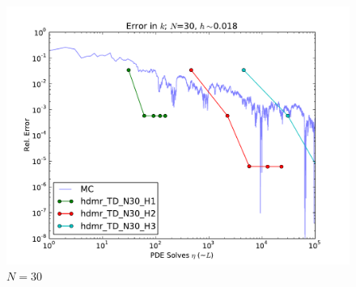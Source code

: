 \documentclass[11pt]{article}
\begin{document}
\begin{figure}[H]
\centering
  \includegraphics[width=0.7\linewidth]{hdmrN30_inc}
  \caption{$N=30$}
  \label{geom}
\end{figure}
\end{document}
